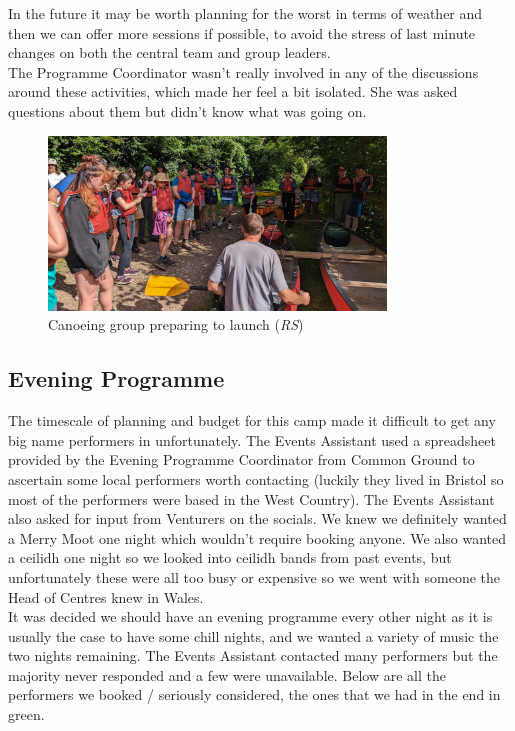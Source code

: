 In the future it may be worth planning for the worst in terms of weather and then we can offer more sessions if possible, to avoid the stress of last minute changes on both the central team and group leaders.\\

The Programme Coordinator wasn't really involved in any of the discussions around these activities, which made her feel a bit isolated. She was asked questions about them but didn't know what was going on.

\begin{figure}[ht]
    \centering
    \includegraphics[width=0.8\textwidth]{assets/adventurous-activities-rs.jpg}
    \caption{Canoeing group preparing to launch (\textit{RS})}
\end{figure}
\subsection{Evening Programme}
The timescale of planning and budget for this camp made it difficult to get any big name performers in unfortunately. The Events Assistant used a spreadsheet provided by the Evening Programme Coordinator from Common Ground to ascertain some local performers worth contacting (luckily they lived in Bristol so most of the performers were based in the West Country). The Events Assistant also asked for input from Venturers on the socials. We knew we definitely wanted a Merry Moot one night which wouldn't require booking anyone. We also wanted a ceilidh one night so we looked into ceilidh bands from past events, but unfortunately these were all too busy or expensive so we went with someone the Head of Centres knew in Wales.\\

It was decided we should have an evening programme every other night as it is usually the case to have some chill nights, and we wanted a variety of music the two nights remaining. The Events Assistant contacted many performers but the majority never responded and a few were unavailable. Below are all the performers we booked / seriously considered, the ones that we had in the end in green.\\

